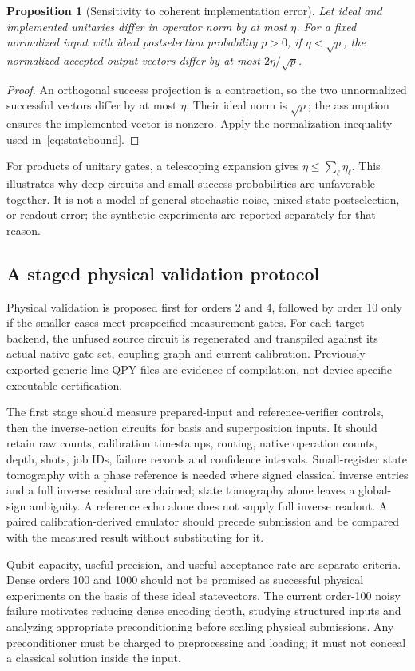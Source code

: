 \documentclass[journal]{IEEEtran}
\newtheorem{proposition}{Proposition}
\begin{document}
\begin{proposition}[Sensitivity to coherent implementation error]
Let ideal and implemented unitaries differ in operator norm by at most
$\eta$. For a fixed normalized input with ideal postselection probability
$p>0$, if $\eta<\sqrt p$, the normalized accepted output vectors differ
by at most $2\eta/\sqrt p$.
\end{proposition}
\begin{proof}
An orthogonal success projection is a contraction, so the two unnormalized
successful vectors differ by at most $\eta$. Their ideal norm is $\sqrt p$;
the assumption ensures the implemented vector is nonzero. Apply the
normalization inequality used in~\eqref{eq:statebound}.
\end{proof}
For products of unitary gates, a telescoping expansion gives
$\eta\leq\sum_\ell\eta_\ell$. This illustrates why deep circuits and small
success probabilities are unfavorable together. It is not a model of
general stochastic noise, mixed-state postselection, or readout error;
the synthetic experiments are reported separately for that reason.

\subsection{A staged physical validation protocol}
Physical validation is proposed first for orders 2 and 4, followed by
order 10 only if the smaller cases meet prespecified measurement gates.
For each target backend, the unfused source circuit is regenerated and
transpiled against its actual native gate set, coupling graph and current
calibration. Previously exported generic-line QPY files are evidence of
compilation, not device-specific executable certification.

The first stage should measure prepared-input and reference-verifier
controls, then the inverse-action circuits for basis and superposition
inputs. It should retain raw counts, calibration timestamps, routing,
native operation counts, depth, shots, job IDs, failure records and
confidence intervals. Small-register state tomography with a phase
reference is needed where signed classical inverse entries and a full
inverse residual are claimed; state tomography alone leaves a global-sign
ambiguity. A reference echo alone does not supply full inverse readout.
A paired calibration-derived emulator should precede
submission and be compared with the measured result without substituting
for it.

Qubit capacity, useful precision, and useful acceptance rate are separate
criteria. Dense orders 100 and 1000 should not be promised as successful
physical experiments on the basis of these ideal statevectors. The current
order-100 noisy failure motivates reducing dense encoding depth, studying
structured inputs and analyzing appropriate preconditioning before scaling
physical submissions. Any preconditioner must be charged to preprocessing
and loading; it must not conceal a classical solution inside the input.
\end{document}

